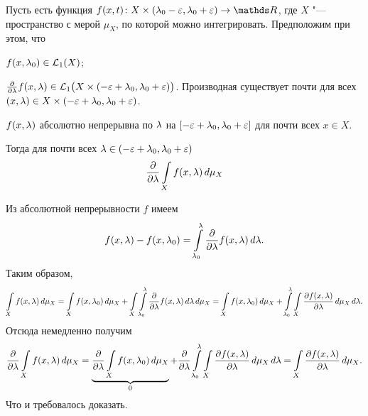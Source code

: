 \begin{The}
  Пусть есть функция $f(x,t)\colon X\times(\l_0-\e,\l_0+\e)\to\R$, где $X$ "--- пространство с мерой $\mu_X$, по которой можно интегрировать. Предположим при этом, что
\begin{roItems}
\item $f(x,\l_0)\in\L_1(X)$;
\item $\CP{ }\l f(x,\l)\in\L_1\big(X\times(-\e+\l_0,\l_0+\e)\big)$. Производная существует почти для всех $(x,\l)\in X\times(-\e+\l_0,\l_0+\e)$.
\item $f(x,\l)$ абсолютно непрерывна по $\l$ на $[-\e+\l_0,\l_0+\e]$ для почти всех $x\in X$.
\end{roItems}
Тогда для почти всех $\l\in(-\e+\l_0,\l_0+\e)$
\[
  \CP{ }\l\I[\mu_X]X{f(x,\l)}
\]
\end{The}
\begin{Proof}
 Из абсолютной непрерывности $f$ имеем
\[
  f(x,\l) - f(x,\l_0) = \int\limits_{\l_0}^\l\CP{ }\l f(x,\l)\,d\l.
\]
Таким образом,
\[
  \Gint Xf(x,\l)\,d\mu_X = 
  \I[\mu_X]X{f(x,\l_0)} + \Gint X\int\limits_{\l_0}^\l\CP{ }\l f(x,\l)\,d\l\,d\mu_X = 
  \I[\mu_X]X{f(x,\l_0)} + \int\limits_{\l_0}^\l\I[\mu_X]X{\CP{f(x,\l)}\l}\,d\l.
\]
Отсюда немедленно получим
\[
  \CP{ }\l\I[\mu_X]X{f(x,\l)} = 
  \underbrace{\CP{ }\l\I[\mu_X]X{f(x,\l_0)}}_0 + 
  \CP{ }\l\int\limits_{\l_0}^\l\I[\mu_X]X{\CP{f(x,\l)}\l}\,d\l =
  \I[\mu_X]X{\CP{f(x,\l)}\l}.
\]
Что и требовалось доказать.
\end{Proof}
